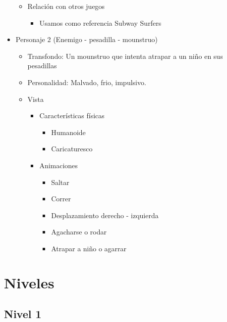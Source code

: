 \begin{itemize}
\begin{itemize}
\begin{itemize}
		            \end{itemize}
		      \item Relación con otros juegos
		            \begin{itemize}
			            \item Usamos como referencia Subway Surfers
		            \end{itemize}
	      \end{itemize}
	\item Personaje 2 (Enemigo - pesadilla - mounstruo)
	      \begin{itemize}
		      \item Transfondo: Un mounstruo que intenta atrapar a un niño en sus pesadillas
		      \item Personalidad: Malvado, frio, impulsivo.
		      \item Vista
		            \begin{itemize}
			            \item Características físicas
			                  \begin{itemize}
				                  \item Humanoide
				                  \item Caricaturesco
			                  \end{itemize}
			            \item Animaciones
			                  \begin{itemize}
				                  \item Saltar
				                  \item Correr
				                  \item Desplazamiento derecho - izquierda
				                  \item Agacharse o rodar
				                  \item Atrapar a niño o agarrar
			                  \end{itemize}
		            \end{itemize}
	      \end{itemize}
\end{itemize}

\section{Niveles}
\subsection{Nivel 1}
